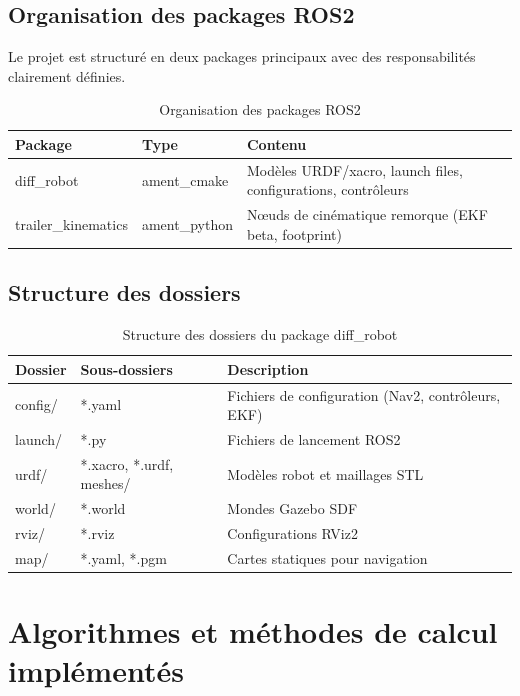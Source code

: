\documentclass[a4paper,12pt]{report}
\begin{document}
\subsection{Organisation des packages ROS2}

Le projet est structuré en deux packages principaux avec des responsabilités clairement définies.

\begin{table}[htbp]
\centering
\caption{Organisation des packages ROS2}
\begin{tabular}{@{}llp{6cm}@{}}
\toprule
\textbf{Package} & \textbf{Type} & \textbf{Contenu} \\
\midrule
diff\_robot & ament\_cmake & Modèles URDF/xacro, launch files, configurations, contrôleurs \\
trailer\_kinematics & ament\_python & Nœuds de cinématique remorque (EKF beta, footprint) \\
\bottomrule
\end{tabular}
\end{table}

\subsection{Structure des dossiers}

\begin{table}[htbp]
\centering
\caption{Structure des dossiers du package diff\_robot}
\begin{tabular}{@{}llp{6cm}@{}}
\toprule
\textbf{Dossier} & \textbf{Sous-dossiers} & \textbf{Description} \\
\midrule
config/ & *.yaml & Fichiers de configuration (Nav2, contrôleurs, EKF) \\
launch/ & *.py & Fichiers de lancement ROS2 \\
urdf/ & *.xacro, *.urdf, meshes/ & Modèles robot et maillages STL \\
world/ & *.world & Mondes Gazebo SDF \\
rviz/ & *.rviz & Configurations RViz2 \\
map/ & *.yaml, *.pgm & Cartes statiques pour navigation \\
\bottomrule
\end{tabular}
\end{table}

\section{Algorithmes et méthodes de calcul implémentés}
\end{document}
